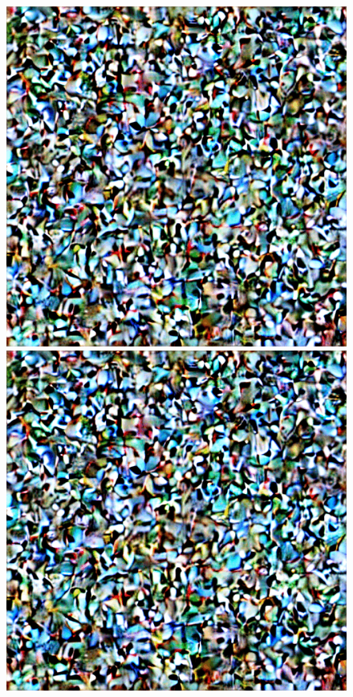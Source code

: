 \begin{figure}[h]
    \centering
    \begin{minipage}{0.10\textwidth}
        \centering
        \includegraphics[width=\textwidth]{images/diffusion_models/noise_to_image_gif/0.png}
    \end{minipage}
    \begin{minipage}{0.10\textwidth}
        \centering
        \includegraphics[width=\textwidth]{images/diffusion_models/noise_to_image_gif/1.png}

\end{minipage}
\end{figure}

